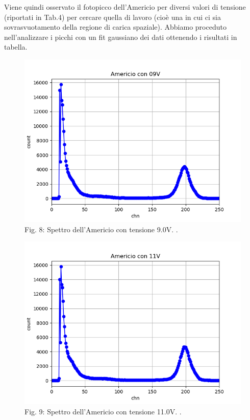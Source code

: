 \documentclass[a4paper]{article}
\begin{document}
Viene quindi osservato il fotopicco dell'Americio per diversi valori di tensione (riportati in Tab.4) per cercare quella di lavoro (cioè una in cui ci sia sovrasvuotamento della regione di carica spaziale).
Abbiamo proceduto nell'analizzare i picchi con un fit gaussiano dei dati ottenendo i risultati in tabella.

\begin{figure}[H]
\includegraphics[width=01\textwidth]{Americio_con_09V}
        \caption{Fig. 8: Spettro dell'Americio con tensione 9.0V. .}
        \label{fig:8}
\end{figure}

\begin{figure}[H]
\includegraphics[width=01\textwidth]{Americio_con_11V}
        \caption{Fig. 9: Spettro dell'Americio con tensione 11.0V. .}
        \label{fig:9}
\end{figure}
\end{document}
